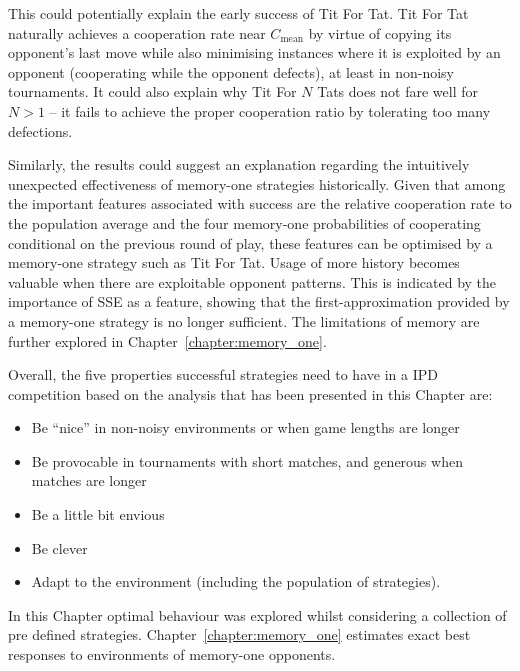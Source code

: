 This could potentially explain the early success of Tit For Tat. Tit For Tat naturally achieves
a cooperation rate near $C_{\text{mean}}$ by virtue of copying its opponent's
last move while also minimising instances where it is exploited by an opponent
(cooperating while the opponent defects), at least in non-noisy tournaments. It
could also explain why Tit For \(N\) Tats does not fare well for $N > 1$ -- it
fails to achieve the proper cooperation ratio by tolerating too many defections.

Similarly, the results could suggest an explanation regarding the intuitively
unexpected effectiveness of memory-one strategies historically. Given that among
the important features associated with success are the relative cooperation rate
to the population average and the four memory-one probabilities of cooperating
conditional on the previous round of play, these features can be optimised by a
memory-one strategy such as Tit For Tat. Usage of more history becomes valuable when
there are exploitable opponent patterns. This is indicated by the importance of
SSE as a feature, showing that the first-approximation provided by a memory-one
strategy is no longer sufficient. The limitations of memory are further explored
in Chapter~\ref{chapter:memory_one}.

Overall, the five properties successful strategies need to have in a IPD competition
based on the analysis that has been presented in this Chapter are:

\begin{itemize}
    \item Be ``nice'' in non-noisy environments or when game lengths are longer
    \item Be provocable in tournaments with short matches, and generous when matches are longer
    \item Be a little bit envious
    \item Be clever
    \item Adapt to the environment (including the population of strategies).
\end{itemize}

In this Chapter optimal behaviour was explored whilst considering a collection
of pre defined strategies. Chapter~\ref{chapter:memory_one} estimates
exact best responses to environments of memory-one opponents.
